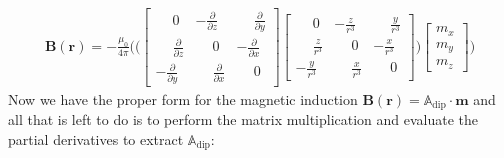 \documentclass[12pt]{article}
\begin{document}
\begin{align}
\label{eqn:magnetic_induction_matrices2}
\mathbf{B}(\mathbf{r}) = -\frac{\mu_0}{4\pi} \Bigg( \Bigg( 
\begin{bmatrix}
\phantom{-}0                           &            -\frac{\partial}{\partial z} &  \phantom{-}\frac{\partial}{\partial y} \\ 
\phantom{-}\frac{\partial}{\partial z} &  \phantom{-}0                           &            -\frac{\partial}{\partial x} \\
          -\frac{\partial}{\partial y} &  \phantom{-}\frac{\partial}{\partial x} &  \phantom{-}0
\end{bmatrix}
\begin{bmatrix}
\phantom{-}0             &           -\frac{z}{r^3} & \phantom{-}\frac{y}{r^3} \\ 
\phantom{-}\frac{z}{r^3} & \phantom{-}0             &           -\frac{x}{r^3} \\
          -\frac{y}{r^3} & \phantom{-}\frac{x}{r^3} & \phantom{-}0
\end{bmatrix} \Bigg)
\begin{bmatrix}
m_x \\
m_y \\
m_z
\end{bmatrix}
\Bigg)
\end{align}
Now we have the proper form for the magnetic induction $\mathbf{B}({\mathbf{r}}) = \mathbb{A}_\mathrm{dip} \cdot \mathbf{m}$ and all that is left to do is to perform the matrix multiplication and evaluate the partial derivatives to extract $\mathbb{A}_\mathrm{dip}$:
\end{document}
